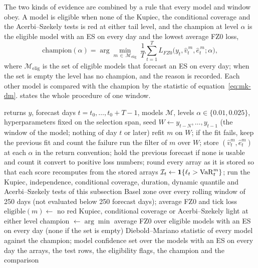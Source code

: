 The two kinds of evidence are combined by a rule that every model and window obey. A model is eligible when none of the Kupiec, the conditional coverage
and the Acerbi--Szekely tests is red at either tail level, and the champion at level $\alpha$ is the eligible model with an ES on every day and the lowest average
FZ0 loss,
\begin{equation}
\mathrm{champion}(\alpha)=\arg\min_{m\,\in\,\mathcal M_{\mathrm{elig}}}\ \frac1T\sum_{t=1}^{T}L_{FZ0}\big(y_t,\widehat v^{\,m}_t,\widehat e^{\,m}_t;\alpha\big),
\label{eq:mk-champion}
\end{equation}
where $\mathcal M_{\mathrm{elig}}$ is the set of eligible models that forecast an ES on every day; when the set is empty the level has no champion, and the
reason is recorded. Each other model is compared with the champion by the statistic of equation~\eqref{eq:mk-dm}.  states the whole
procedure of one window.

\begin{algorithm}[htbp]
\caption{Rolling evaluation of one window of case C11: forecasts, back-tests, eligibility and champion.}
\label{alg:mk-rolling}
\begin{algorithmic}[1]
\Require returns $y$, forecast days $t=t_0,\dots,t_0+T-1$, models $\mathcal M$, levels $\alpha\in\{0.01,0.025\}$, hyperparameters fixed on the selection span, seed
\State $W\gets y_{t-N},\dots,y_{t-1}$ (the window of the model; nothing of day $t$ or later)
\State refit $m$ on $W$; if the fit fails, keep the previous fit and count the failure
\EndIf
\State run the filter of $m$ over $W$; store $(\widehat v^m_t,\widehat e^m_t)$ at each $\alpha$ in the return convention; hold the previous forecast if none is usable and count it
\EndFor
\State convert to positive loss numbers; round every array as it is stored so that each score recomputes from the stored arrays
\State $\mathcal I_t\gets\mathbf{1}\{\ell_t>\mathrm{VaR}^m_t\}$; run the Kupiec, independence, conditional coverage, duration, dynamic quantile and Acerbi--Szekely tests of this subsection
\State Basel zone over every rolling window of 250 days (not evaluated below 250 forecast days); average FZ0 and tick loss
\EndFor
\State $\mathrm{eligible}(m)\gets$ no red Kupiec, conditional coverage or Acerbi--Szekely light at either level
\State champion $\gets\arg\min$ average FZ0 over eligible models with an ES on every day (none if the set is empty)
\State Diebold--Mariano statistic of every model against the champion; model confidence set over the models with an ES on every day
\EndFor
\State \Return the arrays, the test rows, the eligibility flags, the champion and the comparison
\end{algorithmic}
\end{algorithm}

